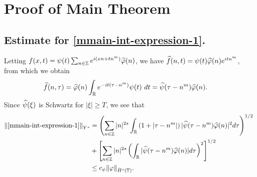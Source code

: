 \section{Proof of Main Theorem}
%
%
%
%
%
%
%
%
%
%
%
\subsection{Estimate for
\texorpdfstring{\eqref{mmain-int-expression-1}}{Expression 1}.}
%
%
Letting $f(x,t) = \psi(t) \sum_{n \in \mathbb{Z}} e^{i(xn + tn^m)} 
\widehat{\varphi}(n)$, we have $\widehat{f}(n,t) = \psi(t) \widehat{\varphi}(n) e^{itn^m}$,
from which we obtain
%
%
\begin{equation}
	\label{mfourier-trans-calc}
	\begin{split}
		\widehat{f}(n, \tau)
		& = \widehat{\varphi}(n) \int_{\mathbb{R}} e^{-it( \tau - n^m)} 
		\psi(t) \ d t
		= \widehat{\psi}(\tau - n^m) \widehat{\varphi}(n).
	\end{split}
\end{equation}
%
%
%
%
%
%
Since $\widehat{\psi}(\xi)$ is Schwartz for $|\xi| \ge T$, we see that 
%
%
\begin{equation}
	\begin{split}
	\label{mmain-int1-est}
		\|\eqref{mmain-int-expression-1}\|_{\dot{Y}^s}
		& = \left (  \sum_{n\in \mathbb{Z}} |n|^{2s} \int_{\mathbb{R}} \left( 1 + | \tau - n^m 
		| \right )
		| \widehat{\psi}(\tau - n^m) \widehat{\varphi}(n) |^2 d \tau \right)^{1/2} 
		\\
		& + \left[ \sum_{n \in \mathbb{Z} }| n |^{2s} \left( \int_{\mathbb{R}} |
		\widehat{\psi}(\tau - n^m)\widehat{\varphi}(n) | d \tau
		\right)^{2} \right]^{1/2}
		\\
		& \le c_{\psi}
		\|\varphi\|_{\dot{H}^s(\mathbb{T})}.
	\end{split}
\end{equation}
%
%
%
%
